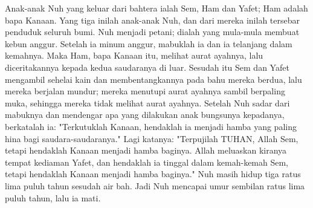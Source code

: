 \begin{biblechapter}
 Anak-anak Nuh yang keluar dari bahtera ialah Sem, Ham dan Yafet; Ham adalah bapa Kanaan.
\verse Yang tiga inilah anak-anak Nuh, dan dari mereka inilah tersebar penduduk seluruh bumi.
\verse Nuh menjadi petani; dialah yang mula-mula membuat kebun anggur.
\verse Setelah ia minum anggur, mabuklah ia dan ia telanjang dalam kemahnya.
\verse Maka Ham, bapa Kanaan itu, melihat aurat ayahnya, lalu diceritakannya kepada kedua saudaranya di luar.
\verse Sesudah itu Sem dan Yafet mengambil sehelai kain dan membentangkannya pada bahu mereka berdua, lalu mereka berjalan mundur; mereka menutupi aurat ayahnya sambil berpaling muka, sehingga mereka tidak melihat aurat ayahnya.
\verse Setelah Nuh sadar dari mabuknya dan mendengar apa yang dilakukan anak bungsunya kepadanya,
\verse berkatalah ia: "Terkutuklah Kanaan, hendaklah ia menjadi hamba yang paling hina bagi saudara-saudaranya."
\verse Lagi katanya: "Terpujilah TUHAN, Allah Sem, tetapi hendaklah Kanaan menjadi hamba baginya.
\verse Allah meluaskan kiranya tempat kediaman Yafet, dan hendaklah ia tinggal dalam kemah-kemah Sem, tetapi hendaklah Kanaan menjadi hamba baginya."
\verse Nuh masih hidup tiga ratus lima puluh tahun sesudah air bah.
\verse Jadi Nuh mencapai umur sembilan ratus lima puluh tahun, lalu ia mati.
\end{biblechapter}

